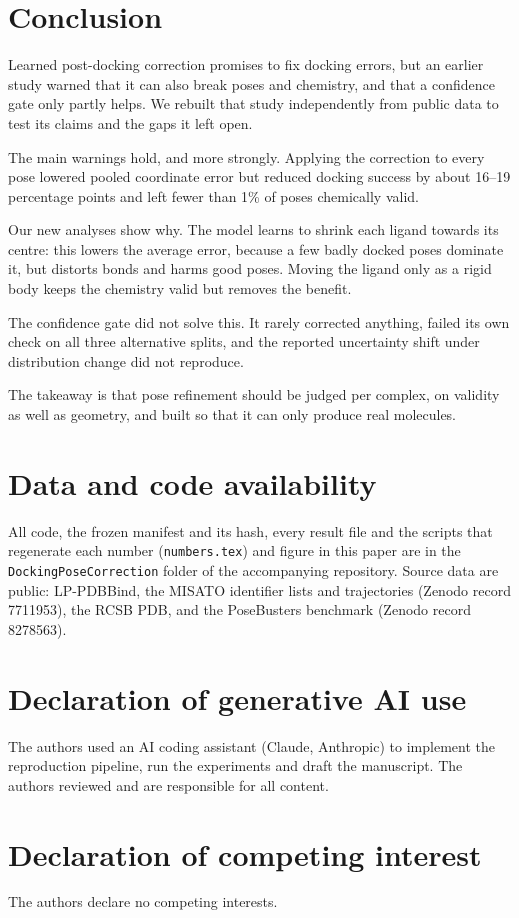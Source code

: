 \documentclass[preprint,12pt,authoryear]{elsarticle}
\begin{document}
\section{Conclusion}\label{sec:conclusion}
Learned post-docking correction promises to fix docking errors, but an earlier study warned that it can also break poses and
chemistry, and that a confidence gate only partly helps. We rebuilt that study independently from public data to test its
claims and the gaps it left open.

The main warnings hold, and more strongly. Applying the correction to every pose lowered pooled coordinate error but reduced
docking success by about 16--19 percentage points and left fewer than 1\% of poses chemically valid.

Our new analyses show why. The model learns to shrink each ligand towards its centre: this lowers the average error, because
a few badly docked poses dominate it, but distorts bonds and harms good poses. Moving the ligand only as a rigid body keeps the
chemistry valid but removes the benefit.

The confidence gate did not solve this. It rarely corrected anything, failed its own check on all three alternative splits,
and the reported uncertainty shift under distribution change did not reproduce.

The takeaway is that pose refinement should be judged per complex, on validity as well as geometry, and built so that it can
only produce real molecules.

\section*{Data and code availability}
All code, the frozen manifest and its hash, every result file and the scripts that regenerate each number (\texttt{numbers.tex})
and figure in this paper are in the \texttt{DockingPoseCorrection} folder of the accompanying repository. Source data are public:
LP-PDBBind, the MISATO identifier lists and trajectories (Zenodo record 7711953), the RCSB PDB, and the PoseBusters benchmark
(Zenodo record 8278563).

\section*{Declaration of generative AI use}
The authors used an AI coding assistant (Claude, Anthropic) to implement the reproduction pipeline, run the experiments and draft
the manuscript. The authors reviewed and are responsible for all content.

\section*{Declaration of competing interest}
The authors declare no competing interests.



\end{document}
